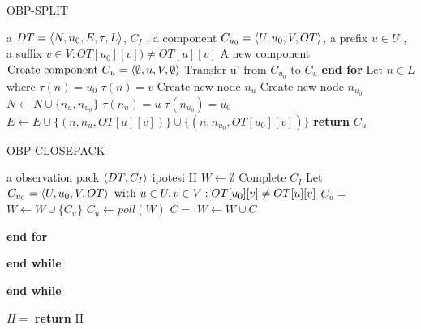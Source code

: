 \begin{algorithm}
\caption{OBP-SPLIT}\label{alg:split}
\begin{algorithmic}[1]
\Statex
\Input a $DT=\Braket{N,n_0,E,\tau,L}$, $C_I$ , a component $C_{u_{0}}=\Braket{U,u_0,V,OT}$, a prefix $u \in U$ , a suffix $v \in V : OT[u_0][v]) \neq OT[u][v]$
\Output A new component
\State $\text{Create component } C_u=\Braket{\emptyset,u,V,\emptyset}$
     \State $\text{Transfer u' from } C_{u_{0}} \text{ to } C_{u} $ 
     \EndIf
     \EndFor
     \State \textbf{end for}
      \State Let $n \in L$ where $\tau(n)=u_0$ 
      \State $\tau(n) = v$ 
      \State Create new node $n_u$
      \State Create new node $n_{u_{0}}$
      \State $N \gets N \cup \{n_u,n_{u_{0}}\}$
      \State $\tau(n_u) = u$
      \State $\tau(n_{u_{0}}) = u_0$
      \State $E \gets E \cup \{(n,n_u,OT[u][v])\} \cup \{(n,n_{u_{0}},OT[u_0][v])\}$
    \State \textbf{return} $C_u$
\end{algorithmic}
\end{algorithm}



\begin{algorithm}
\caption{OBP-CLOSEPACK}\label{alg:clp}
\begin{algorithmic}[1]
\Statex
\Input a observation pack $\Braket{DT,C_{I}}$
\Output ipotesi H
\State $W \gets \emptyset $  
      \label{lin:clpunclosed}
     \State Complete $C_I$
     \State Let $C_{u_{0}} = \Braket{U,u_0,V,OT} \text{ with } u \in U, v \in V : OT[u_0][v] \neq OT[u][v]$ \label{lin:clpsuffix}
     \State $C_u = $ 
     \State $W \gets W \cup \{C_u\}$
     \State $C_u \gets poll(W)$ 
     \State $C = $ 
     \State $W \gets W \cup C$
     \EndIf
    
     \EndFor
      \State \textbf{end for}
     
     \EndWhile
     \State \textbf{end while}
    
    \EndWhile
    \State \textbf{end while} 
    
    \State $H= $ 
    \State \textbf{return } H
     
\end{algorithmic}
\end{algorithm}

